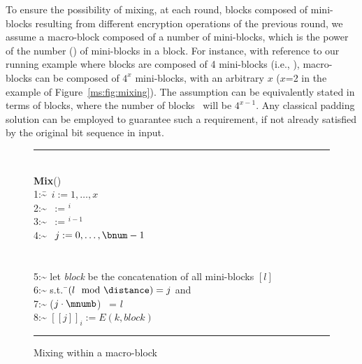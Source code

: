 To ensure the possibility of mixing, at each round, blocks composed of mini-blocks resulting from different encryption operations of the previous round, we assume a macro-block composed of a number of mini-blocks, which is the power of the number (\mnumb) of mini-blocks in a block. For instance, with reference to our running example where blocks are composed of 4 mini-blocks (i.e., ), macro-blocks can be composed of $4^x$ mini-blocks, with an arbitrary $x$ ($x$=2 in the example of Figure~\ref{ms:fig:mixing}). The assumption can be equivalently stated in terms of blocks, where the number of blocks \bnum\ will be $4^{x-1}$. Any classical padding solution can be employed to guarantee such a requirement, if not already satisfied by the original bit sequence in input.

\begin{figure}[!t]
\begin{small}
\hrule          %
\begin{tabbing}
\hfill\\
{\bf Mix}(\macroblock{})\\[1em]
\num{1:~}\= \myfor\ $i:= 1, \ldots, x$  \\[0.3em]
\num{2:~}\2 \spanna\ := \mnumb$^i$  \\[0.3em]
\num{3:~}\2 \distance\ := \mnumb$^{i -1}$ \\[0.3em]
\num{4:~}\2 \myfor\ $j:= 0, \ldots, \bnum -1$  \\[0.3em]
             \3 \\[0.3em]
             \3 \\[0.3em]
\num{5:~}\3 let \= {\em block} be the concatenation of all mini-blocks $[l]$\\[0.3em]
\num{6:~}\4 s.t.\= \ $(l\mod\distance) = j$ and  \\[0.3em]
\num{7:~}\5 ($j \cdot \mnumb$) \mydiv \spanna\ = $l$ \mydiv \spanna\\[0.3em]
\num{8:~}\3 $[[j]]_i := E(k,block)$ 
\end{tabbing}
\hrule
\vspace{.5em}
\end{small}
\caption{\label{ms:fig:encrypt}Mixing within a macro-block \macroblock{}}
\end{figure}

